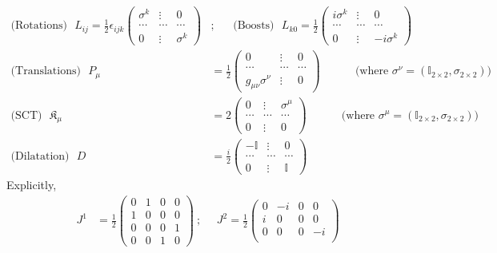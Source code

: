 \documentclass[]{article}
\numberwithin{equation}{section}
\begin{document}
{{\begin{align}
    \text{(Rotations)}~~~L_{ij}=\frac{1}{2}\epsilon_{ijk}\begin{pmatrix}
    \sigma^{k}&\vdots&0\\
    \cdots&\cdots&\cdots\\
    0&\vdots&\sigma^{k}
    \end{pmatrix}&;~~~~~~~
    \text{(Boosts)}~~~L_{k0}=\frac{1}{2}\begin{pmatrix}
    i\sigma^{k}&\vdots&0\\
    \cdots&\cdots&\cdots\\
    0&\vdots&-i \sigma^{k}
    \end{pmatrix}\\
    \text{(Translations)}~~~P_{\mu}&=\frac{1}{2}\begin{pmatrix}
    0&\vdots&0\\
    \cdots&\cdots&\cdots\\
    g_{\mu\nu}\sigma^{\nu}&\vdots&0
    \end{pmatrix}~~~~~~~~~~~~~~\text{(where $\sigma^{\nu}=(\mathbb{I}_{2\times2},\sigma_{2\times2})$)}\\
    \text{(SCT)}~~~\mathfrak{K}_{\mu}&=2\begin{pmatrix}
    0&\vdots&\sigma^{\mu}\\
    \cdots&\cdots&\cdots\\
    0&\vdots&0
    \end{pmatrix}~~~~~~~~~~~~~~\text{(where $\sigma^{\mu}=(\mathbb{I}_{2\times2},\sigma_{2\times2})$)}\\
    \text{(Dilatation)}~~~D&=\frac{i}{2}\begin{pmatrix}
    -\mathbb{I}&\vdots&0\\
    \cdots&\cdots&\cdots\\
    0&\vdots&\mathbb{I}
    \end{pmatrix}
\end{align}
Explicitly,
\begin{align*}
    J^{1}&=\frac{1}{2}\begin{pmatrix}
    0&1&0&0\\
    1&0&0&0\\
    0&0&0&1\\
    0&0&1&0
    \end{pmatrix}~;~~~~~~J^{2}=\frac{1}{2}\begin{pmatrix}
    0&-i&0&0\\
    i&0&0&0\\
    0&0&0&-i\\

\end{pmatrix}
\end{align*}}}
\end{document}
